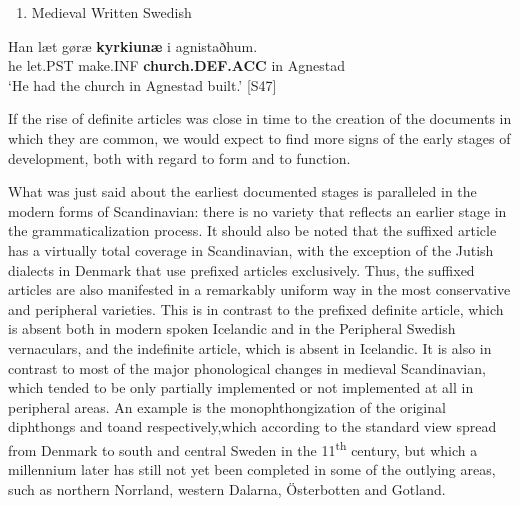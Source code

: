 \begin{enumerate} %
\item 
Medieval Written Swedish 

\end{enumerate} %
\ea\label{}
\gll Han  læt  gøræ  \textbf{kyrkiunæ} i  agnistaðhum.\\


he  let.PST  make.INF  \textbf{church.DEF.ACC} in  Agnestad\\ %


‘He had the church in Agnestad built.’ [S47]
\z

If the rise of definite articles was close in time to the creation of the documents in which they are common, we would expect to find more signs of the early stages of development, both with regard to form and to function.

What was just said about the earliest documented stages is paralleled in the modern forms of Scandinavian: there is no variety that reflects an earlier stage in the grammaticalization process. It should also be noted that the suffixed article has a virtually total coverage in Scandinavian, with the exception of the Jutish dialects in Denmark that use prefixed articles exclusively. Thus, the suffixed articles are also manifested in a remarkably uniform way in the most conservative and peripheral varieties. This is in contrast to the prefixed definite article, which is absent both in modern spoken Icelandic and in the Peripheral Swedish vernaculars, and the indefinite article, which is absent in Icelandic. It is also in contrast to most of the major phonological changes in medieval Scandinavian, which tended to be only partially implemented or not implemented at all in peripheral areas. An example is the monophthongization of the original diphthongs  and toand respectively,\textstyleLinguisticExample{ }which according to the standard view spread from Denmark to south and central Sweden in the 11\textsuperscript{th} century, but which a millennium later has still not yet been completed in some of the outlying areas, such as northern Norrland, western Dalarna, Österbotten and Gotland.  

